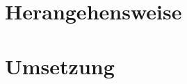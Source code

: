 







\begingroup
\parskip=0pt
\tableofcontents
\endgroup

\clearpage


\clearpage
\section{Herangehensweise}
%
%
%

\clearpage
\section{Umsetzung}
%

\clearpage


%
%
%

